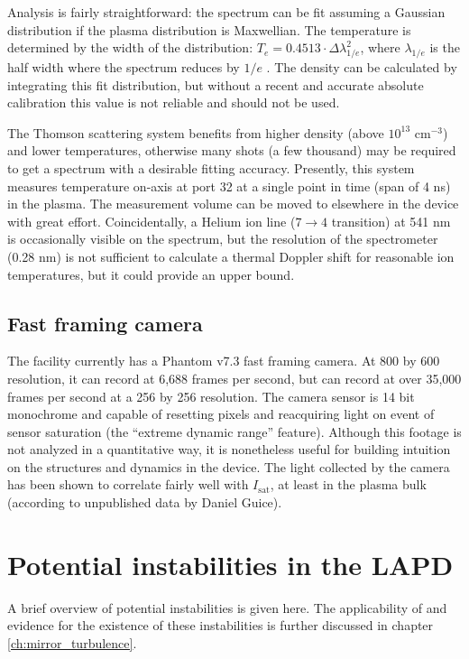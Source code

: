 Analysis is fairly straightforward: the spectrum can be fit assuming a Gaussian distribution if the plasma distribution is Maxwellian. The temperature is determined by the width of the distribution: $T_e = 0.4513 \cdot \Delta \lambda_{1/e}^2$, where $\lambda_{1/e}$ is the half width where the spectrum reduces by $1/e$ \cite{ghazaryan_thomson_2022}. The density can be calculated by integrating this fit distribution, but without a recent and accurate absolute calibration this value is not reliable and should not be used.

The Thomson scattering system benefits from higher density (above $10^{13}$ cm$^{-3}$) and lower temperatures, otherwise many shots (a few thousand) may be required to get a spectrum with a desirable fitting accuracy. Presently, this system measures temperature on-axis at port 32 at a single point in time (span of 4 ns) in the plasma. The measurement volume can be moved to elsewhere in the device with great effort. Coincidentally, a Helium ion line ($7 \rightarrow 4$ transition) at 541 nm is occasionally visible on the spectrum, but the resolution of the spectrometer (0.28 nm) is not sufficient to calculate a thermal Doppler shift for reasonable ion temperatures, but it could provide an upper bound.

\subsection{Fast framing camera}

The facility currently has a Phantom v7.3 fast framing camera. At 800 by 600 resolution, it can record at 6,688 frames per second, but can record at over 35,000 frames per second at a 256 by 256 resolution. The camera sensor is 14 bit monochrome and capable of resetting pixels and reacquiring light on event of sensor saturation (the ``extreme dynamic range'' feature). Although this footage is not analyzed in a quantitative way, it is nonetheless useful for building intuition on the structures and dynamics in the device. The light collected by the camera has been shown to correlate fairly well with $I_\text{sat}$, at least in the plasma bulk (according to unpublished data by Daniel Guice). 

\section{Potential instabilities in the LAPD}

A brief overview of potential instabilities is given here. The applicability of and evidence for the existence of these instabilities is further discussed in chapter \ref{ch:mirror_turbulence}.

